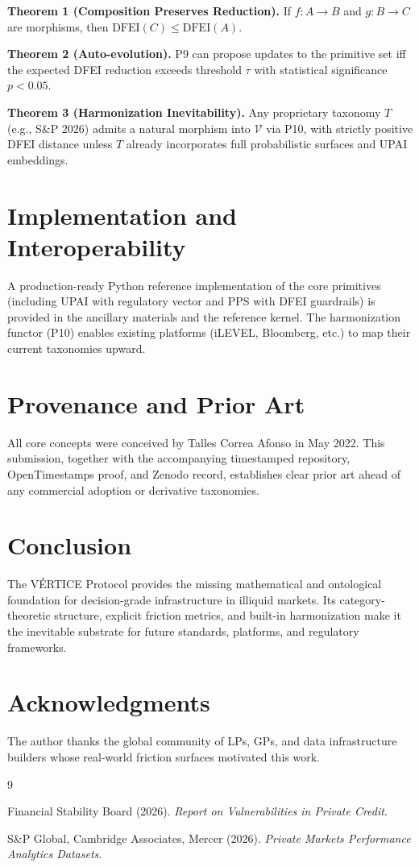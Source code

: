 \documentclass[11pt,a4paper]{article}
\begin{document}
\textbf{Theorem 1 (Composition Preserves Reduction).} If $f: A \to B$ and $g: B \to C$ are morphisms, then $\mathrm{DFEI}(C) \le \mathrm{DFEI}(A)$.

\textbf{Theorem 2 (Auto-evolution).} P9 can propose updates to the primitive set iff the expected DFEI reduction exceeds threshold $\tau$ with statistical significance $p < 0.05$.

\textbf{Theorem 3 (Harmonization Inevitability).} Any proprietary taxonomy $T$ (e.g., S\&P 2026) admits a natural morphism into $\mathcal{V}$ via P10, with strictly positive DFEI distance unless $T$ already incorporates full probabilistic surfaces and UPAI embeddings.

\section{Implementation and Interoperability}

A production-ready Python reference implementation of the core primitives (including UPAI with regulatory vector and PPS with DFEI guardrails) is provided in the ancillary materials and the reference kernel. The harmonization functor (P10) enables existing platforms (iLEVEL, Bloomberg, etc.) to map their current taxonomies upward.

\section{Provenance and Prior Art}

All core concepts were conceived by Talles Correa Afonso in May 2022. This submission, together with the accompanying timestamped repository, OpenTimestamps proof, and Zenodo record, establishes clear prior art ahead of any commercial adoption or derivative taxonomies.

\section{Conclusion}

The VÉRTICE Protocol provides the missing mathematical and ontological foundation for decision-grade infrastructure in illiquid markets. Its category-theoretic structure, explicit friction metrics, and built-in harmonization make it the inevitable substrate for future standards, platforms, and regulatory frameworks.

\section*{Acknowledgments}
The author thanks the global community of LPs, GPs, and data infrastructure builders whose real-world friction surfaces motivated this work.


\begin{thebibliography}{9}

Financial Stability Board (2026). \textit{Report on Vulnerabilities in Private Credit}.

S\&P Global, Cambridge Associates, Mercer (2026). \textit{Private Markets Performance Analytics Datasets}.

\end{thebibliography}
\end{document}
